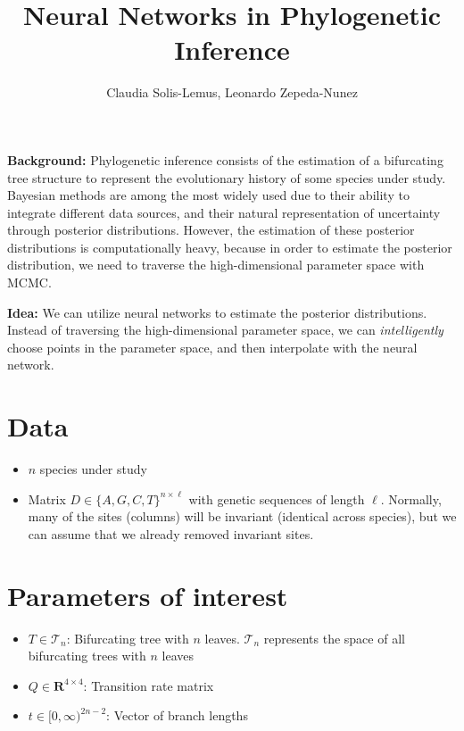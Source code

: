 \documentclass[]{article}
\title{Neural Networks in Phylogenetic Inference}
\author{Claudia Solis-Lemus, Leonardo Zepeda-Nunez}
\date{}
\providecommand{\tightlist}{%
  \setlength{\itemsep}{0pt}\setlength{\parskip}{0pt}}
\begin{document}
\maketitle

\textbf{Background:} Phylogenetic inference consists of the estimation
of a bifurcating tree structure to represent the evolutionary history of
some species under study. Bayesian methods are among the most widely
used due to their ability to integrate different data sources, and their
natural representation of uncertainty through posterior distributions.
However, the estimation of these posterior distributions is
computationally heavy, because in order to estimate the posterior
distribution, we need to traverse the high-dimensional parameter space
with MCMC.

\textbf{Idea:} We can utilize neural networks to estimate the posterior
distributions. Instead of traversing the high-dimensional parameter
space, we can \emph{intelligently} choose points in the parameter space,
and then interpolate with the neural network.

\hypertarget{data}{%
\section{Data}\label{data}}

\begin{itemize}
\tightlist
\item
  \(n\) species under study
\item
  Matrix \(D \in \{A,G,C,T\}^{n \times \ell}\) with genetic sequences of
  length \(\ell\). Normally, many of the sites (columns) will be
  invariant (identical across species), but we can assume that we
  already removed invariant sites.
\end{itemize}

\hypertarget{parameters-of-interest}{%
\section{Parameters of interest}\label{parameters-of-interest}}

\begin{itemize}
\tightlist
\item
  \(T \in \mathcal{T}_n\): Bifurcating tree with \(n\) leaves.
  \(\mathcal{T}_n\) represents the space of all bifurcating trees with
  \(n\) leaves
\item
  \(Q \in \mathbf{R}^{4 \times 4}\): Transition rate matrix
\item
  \(t \in [0,\infty)^{2n-2}\): Vector of branch lengths
\end{itemize}
\end{document}
